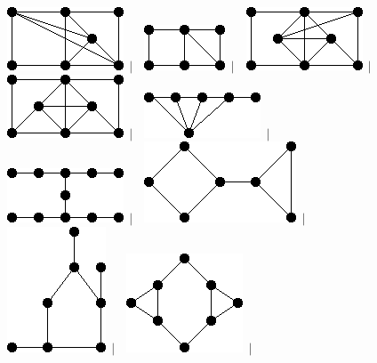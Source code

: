 \documentclass[11pt,paper=b5,footinclude,headinclude]{scrbook} %
\newtheorem{ex}{Vaja\hypertarget{sol:\theex}}[chapter]
\begin{document}
\begin{ex}
\begin{figure}
\includegraphics[scale=0.5]{smallGraphs/g_X46.png}$\,\mid\,$\
\includegraphics[scale=0.5]{smallGraphs/g_X5.png}$\,\mid\,$\
\includegraphics[scale=0.5]{smallGraphs/g_X50.png}$\,\mid\,$\
\includegraphics[scale=0.5]{smallGraphs/g_X51.png}$\,\mid\,$\
\includegraphics[scale=0.5]{smallGraphs/g_X58.png}$\,\mid\,$\
\includegraphics[scale=0.5]{smallGraphs/g_X59.png}$\,\mid\,$\
\includegraphics[scale=0.5]{smallGraphs/g_X7.png}$\,\mid\,$\
\includegraphics[scale=0.5]{smallGraphs/g_X71.png}$\,\mid\,$\
\includegraphics[scale=0.5]{smallGraphs/g_X74.png}$\,\mid\,$\

\end{figure}
\end{ex}
\end{document}
